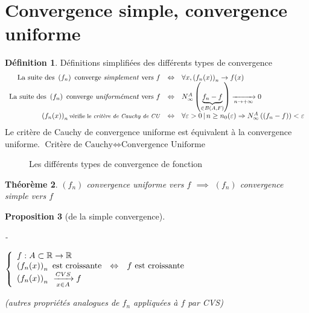 \documentclass[11pt,a4paper]{report}
\newtheorem{theorem}{Théorème}[chapter]
\newtheorem{prop}[theorem]{Proposition}
\theoremstyle{definition}
\newtheorem{dfn}[theorem]{Définition}
\begin{document}
\section{Convergence simple, convergence uniforme}
\begin{dfn}
Définitions simplifiées des différents types de convergence
\begin{equation}\label{CV fonctions}
\begin{array}{r c l} %
\text{La suite des }\left(f_n\right) \text{ converge \emph{simplement} vers } f&\Leftrightarrow &\forall x, \left(f_n(x)\right)_n \to f(x)\\
\text{La suite des }\left(f_n\right) \text{ converge \emph{uniformément} vers } f&\Leftrightarrow &N^A_\infty\left(\underbrace{f_n-f}_{\in B(A,F)}\right)\xrightarrow[n\to +\infty]{}0\\
\left(f_n(x)\right)_n\text{{\footnotesize  vérifie le \emph{critère de Cauchy de CU}}}&\Leftrightarrow&\forall \varepsilon>0\, |\, n\ge n_0(\varepsilon) \Rightarrow N^A_\infty\left((f_n-f)\right)< \varepsilon\\
\end{array}
\end{equation}
Le critère de Cauchy de convergence uniforme est équivalent à la convergence uniforme. $\boxed{\text{Critère de Cauchy}\Leftrightarrow\text{Convergence Uniforme}}$
\end{dfn}
\begin{figure}[h t]

\caption{Les différents types de convergence de fonction}
\end{figure}
\begin{theorem}
     $(f_n)$ convergence uniforme vers $f$ $\implies$ $(f_n)$ convergence simple vers $f$
\end{theorem}
\begin{prop}[de la simple convergence]
\begin{list}{-}{ }
\item $\left\lbrace
\begin{array}{l c l}
f:A\subset\ensuremath{\mathbb{R}}\to\ensuremath{\mathbb{R}}& & \\
\left(f_n(x)\right)_n\text{ est croissante}&\Leftrightarrow&f\text{ est croissante}\\
\left(f_n(x)\right)_n\ \xrightarrow[x\in{}A]{CVS}f& & \\
\end{array}\right.$
\item (autres propriétés analogues de $f_n$ appliquées à $f$ par CVS)
\end{list}
\end{prop}
%
\end{document}

